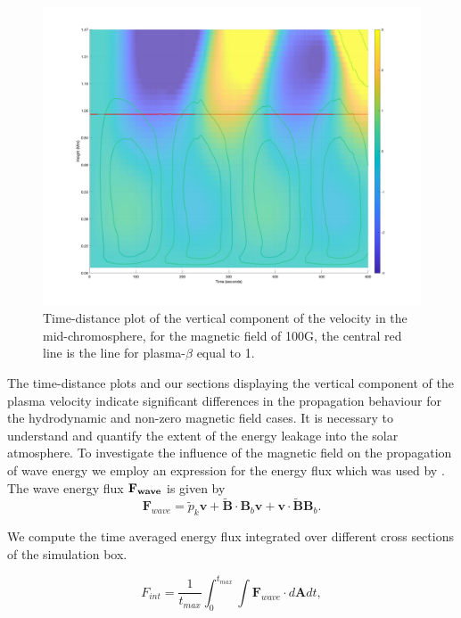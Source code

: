 \documentclass[physics,article,submit,pdftex,moreauthors]{Definitions/mdpi}
\begin{document}
\begin{figure}
\centering
\label{td_vert_dif_bv0G_100G_300}
\includegraphics[scale=0.163]{td_vert_bv100G_300_with_bandbeta.jpeg}
\caption{Time-distance plot of the vertical component of the velocity in the mid-chromosphere, for the magnetic field of 100G, the central red line is the line for plasma-$\beta$  equal to 1.}
\end{figure}

The time-distance plots and our sections displaying the vertical component of the plasma velocity indicate significant differences in the propagation behaviour for the hydrodynamic and non-zero magnetic field cases. It is necessary to understand and quantify the extent of the energy leakage into the solar atmosphere. To investigate the influence of the magnetic field on the propagation of wave energy we employ an expression for the energy flux which was used by \citet{Bogdan2003}. The wave energy flux $\bf{F}_{wave}$ is given by
$$
{\mathbf F}_{wave}=\tilde{p}_{k} {\mathbf v}+\tilde{\mathbf B}\cdot {\mathbf B_{b}}{\mathbf v}+{\mathbf v}\cdot \tilde{\mathbf B}{\mathbf B_{b}} .
$$

We compute the time averaged energy flux integrated over different cross sections of the simulation box.

\begin{equation}
F_{int}= \frac{1}{t_{max}} \int_{0}^{t_{max}} \int {\mathbf F}_{wave} \cdot d{\mathbf A}dt,
\label{e11}
\end{equation}
\end{document}
